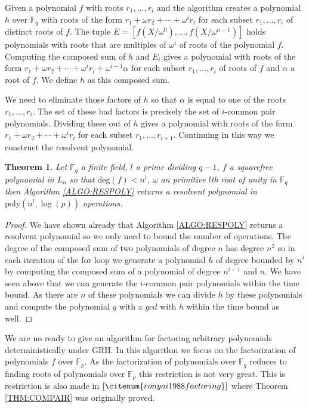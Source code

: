\documentclass{article}
\newcounter{dummy} \numberwithin{dummy}{section}
\theoremstyle{plain}
\newtheorem{thm}[dummy]{Theorem}
\theoremstyle{definition}
\def\Fp {{ \mathbb{F} _ {p} }}
\def\Fq {{ \mathbb{F} _ {q} }}
\def\deg {{ \mathrm{deg}}}
\def\poly {{ \mathrm{poly} }}
\begin{document}
		Given a polynomial $f$ with roots $r_1,\ldots, r_i$ and the algorithm creates a polynomial $h$ over $\Fq$ with roots of the form $r_1+\omega r_2 + \cdots + \omega^{i} r_i$ for each subset $r_1,\ldots,r_i$ of distinct roots of $f$. The tuple $E=[f(X/ \omega^0),\ldots,f(X/ \omega^{n-1})]$ holds polynomials with roots that are multiples of $\omega^i$ of roots of the polynomial $f$. Computing the composed sum of $h$ and $E_i$ gives a polynomial with roots of the form $r_1+\omega r_2 + \cdots + \omega^{i} r_i + \omega^{i+1} \alpha$ for each subset $r_1,\ldots,r_i$ of roots of $f$ and $\alpha$ a root of $f$. We define $h$ as this composed sum. 
		
		We need to eliminate those factors of $h$ so that $\alpha$ is equal to one of the roots $r_1,\ldots,r_i$. The set of these bad factors is precisely the set of $i$-common pair polynomials. Dividing these out of $h$ gives a polynomial with roots of the form $r_1+\omega r_2 + \cdots + \omega^{i} r_i$ for each subset $r_1,\ldots,r_{i+1}$. Continuing in this way we construct the resolvent polynomial.
				
		\begin{thm}
		    Let $\Fq$ a finite field, $l$ a prime dividing $q-1$, $f$ a squarefree polynomial in $L_n$ so that $\deg(f) < n^l$, $\omega$ an primitive $l$th root of unity in $\Fq$ then Algorithm \ref{ALGO:RESPOLY} returns a resolvent polynomial in $\poly(n^l,\log(p))$ operations. 
		\end{thm}
		
		\begin{proof}
		    We have shown already that Algorithm \ref{ALGO:RESPOLY} returns a resolvent polynomial so we only need to bound the number of operations. The degree of the composed sum of two polynomials of degree $n$ has degree $n^2$ so in each iteration of the for loop we generate a polynomial $h$ of degree bounded by $n^i$ by computing the composed sum of a polynomial of degree $n^{i-1}$ and $n$. We have seen above that we can generate the $i$-common pair polynomials within the time bound. As there are $n$ of these polynomials we can divide $h$ by these polynomials and compute the polynomial $g$ with a $gcd$ with $h$ within the time bound as well. 
		\end{proof}
		
		We are no ready to give an algorithm for factoring arbitrary polynomials deterministically under GRH. In this algorithm we focus on the factorization of polynomials $f$ over $\Fp$. As the factorization of polynomials over $\Fq$ reduces to finding roots of polynomials over $\Fp$ this restriction is not very great. This is restriction is also made in $[\citenum{ronyai1988factoring}]$ where Theorem \ref{THM:COMPAIR} was originally proved. 
				
\end{document}
